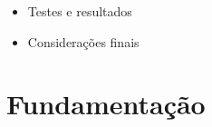 \documentclass[10pt]{beamer}
\begin{document}
\begin{frame}
\begin{itemize}
    \item[\color{gray}{$\bullet$}] Testes e resultados

    \item[\color{gray}{$\bullet$}] Considerações finais

  \end{itemize}

\end{frame}


\section{Fundamentação}
\end{document}
